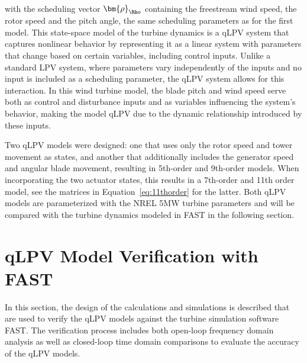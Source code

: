 {\begin{equation}
\begin{aligned}
    \end{aligned}
\end{equation}
%
with the scheduling vector $\bm{\rho}_{\Rho}$ containing the freestream wind speed, the rotor speed and the pitch angle, the same scheduling parameters as for the first model.
This state-space model of the turbine dynamics is a qLPV system that captures nonlinear behavior by representing it as a linear system with parameters that change based on certain variables, including control inputs. Unlike a standard LPV system, where parameters vary independently of the  inputs and no input is included as a scheduling parameter, the qLPV system allows for this interaction. In this wind turbine model, the blade pitch and wind speed serve both as control and disturbance inputs and as variables influencing the system's behavior, making the model qLPV due to the dynamic relationship introduced by these inputs.

Two qLPV models were designed: one that uses only the rotor speed and tower movement as states, and another that additionally includes the generator speed and angular blade movement, resulting in 5th-order and 9th-order models. When incorporating the two actuator states, this results in a 7th-order and 11th order model, see the matrices in Equation~\ref{eq:11thorder} for the latter. Both qLPV models are parameterized with the NREL 5MW turbine parameters and will be compared with the turbine dynamics modeled in FAST in the following section.
%
\section{qLPV Model Verification with FAST} \label{sec:qLPVModelVerificationwithFAST0} 
In this section, the design of the calculations and simulations is described that are used to verify the qLPV models against the turbine simulation software FAST. The verification process includes both open-loop frequency domain analysis as well as closed-loop time domain comparisons to evaluate the accuracy of the qLPV models. 
}
